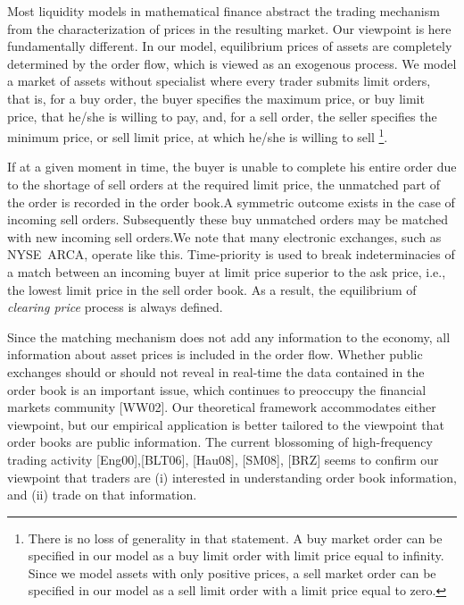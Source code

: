 \documentclass{article}
\begin{document}
Most liquidity models in mathematical finance abstract the trading mechanism
from the characterization of prices in the resulting market. Our viewpoint
is here fundamentally different. In our model, equilibrium prices of assets
are completely determined by the order flow, which is viewed as an exogenous
process. We model a market of assets without specialist where every trader
submits limit orders, that is, for a buy order, the buyer specifies the
maximum price, or buy limit price, that he/she is willing to pay, and, for a
sell order, the seller specifies the minimum price, or sell limit price, at
which he/she is willing to sell \footnote{%
There is no loss of generality in that statement. A buy market order can be
specified in our model as a buy limit order with limit price equal to
infinity. Since we model assets with only positive prices, a sell market
order can be specified in our model as a sell limit order with a limit price
equal to zero.}.

If at a given moment in time, the buyer is unable to complete his entire
order due to the shortage of sell orders at the required limit price, the
unmatched part of the order is recorded in the order book.A symmetric
outcome exists in the case of incoming sell orders. Subsequently these buy
unmatched orders may be matched with new incoming sell orders.We note that
many electronic exchanges, such as NYSE\ ARCA, operate like this.
Time-priority is used to break indeterminacies of a match between an
incoming buyer at limit price superior to the ask price, i.e., the lowest
limit price in the sell order book. As a result, the equilibrium of \textit{%
clearing price} process is always defined.

Since the matching mechanism does not add any information to the economy,
all information about asset prices is included in the order flow. Whether
public exchanges should or should not reveal in real-time the data contained
in the order book is an important issue, which continues to preoccupy the
financial markets community [WW02]. Our theoretical framework accommodates
either viewpoint, but our empirical application is better tailored to the
viewpoint that order books are public information. The current blossoming of
high-frequency trading activity [Eng00],[BLT06], [Hau08], [SM08], [BRZ]
seems to confirm our viewpoint that traders are (i) interested in
understanding order book information, and (ii) trade on that information.
\end{document}
